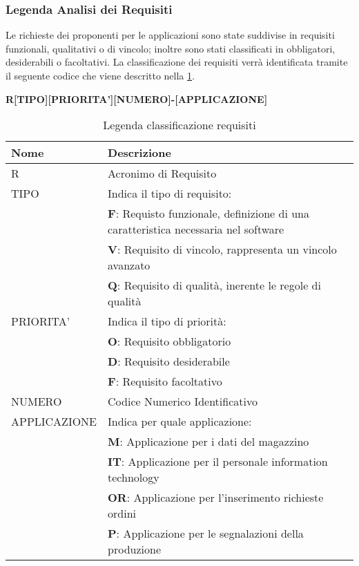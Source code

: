 \subsubsection{Legenda Analisi dei Requisiti}
Le richieste dei proponenti per le applicazioni sono state suddivise in requisiti funzionali, qualitativi o di vincolo; inoltre sono stati classificati in obbligatori, desiderabili o facoltativi.
La classificazione dei requisiti verrà identificata tramite il seguente codice che viene descritto nella \tablename \space \ref*{tab:Requisiti}.
\begin{center}
  \textbf{R[TIPO][PRIORITA'][NUMERO]-[APPLICAZIONE]}
\end{center}
\renewcommand{\arraystretch}{1.5} %
\begin{table}[bh]
\begin{tabular}{ |m{8em}|m{26em}| }
  \hline
  \textbf{Nome} & \textbf{Descrizione} \\
  \hline
  R & Acronimo di Requisito \\
  \hline
  TIPO & Indica il tipo di requisito: \\
        & \textbf{F}: Requisto funzionale, definizione di una caratteristica necessaria nel software \\
        &	\textbf{V}: Requisito di vincolo, rappresenta un vincolo avanzato \\
        &	\textbf{Q}: Requisito di qualità, inerente le regole di qualità \\
  \hline
  PRIORITA' & Indica il tipo di priorità: \\
        &	\textbf{O}: Requisito obbligatorio \\
        &	\textbf{D}: Requisito desiderabile \\
        &	\textbf{F}: Requisito facoltativo \\
  \hline
  NUMERO & Codice Numerico Identificativo \\
  \hline
  APPLICAZIONE & Indica per quale applicazione: \\
               & \textbf{M}: Applicazione per i dati del magazzino \\
               & \textbf{IT}: Applicazione per il personale information technology \\
               & \textbf{OR}: Applicazione per l'inserimento richieste ordini \\
               & \textbf{P}: Applicazione per le segnalazioni della produzione \\
  \hline
\end{tabular}
\caption{Legenda classificazione requisiti}
\label{tab:Requisiti}
\end{table}

